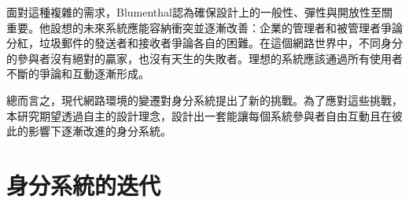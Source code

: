 面對這種複雜的需求，Blumenthal\cite{Blumenthal2001RethinkingThe}認為確保設計上的一般性、彈性與開放性至關重要。他設想的未來系統應能容納衝突並逐漸改善：企業的管理者和被管理者爭論分紅，垃圾郵件的發送者和接收者爭論各自的困難。在這個網路世界中，不同身分的參與者沒有絕對的贏家，也沒有天生的失敗者。理想的系統應該通過所有使用者不斷的爭論和互動逐漸形成。

總而言之，現代網路環境的變遷對身分系統提出了新的挑戰。為了應對這些挑戰，本研究期望透過自主的設計理念，設計出一套能讓每個系統參與者自由互動且在彼此的影響下逐漸改進的身分系統。
\section{身分系統的迭代}
\begin{table}[htbp]
  \centering
  \caption{身分系統需求比較表}
  \label{tab:compare-old-id}
\end{table}
